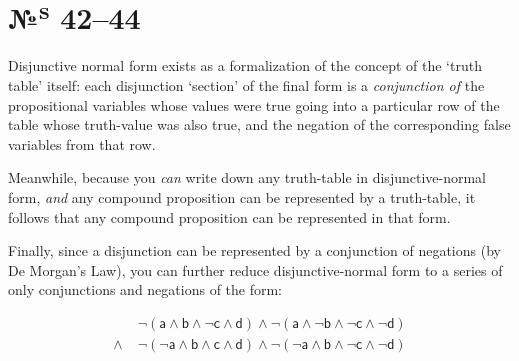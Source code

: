 \documentclass[
   paper=a4,
   fontsize=11pt,
   parskip=no,       %
   fleqn             %
]{scrartcl}
\begin{document}
\pagebreak[2]
\section*{№\kern-0.5bp\textsuperscript{s} 42–44}      %

Disjunctive normal form exists as a formalization of the concept of the ‘truth table’ itself: each
disjunction ‘section’ of the final form is a \textit{conjunction of} the propositional variables
whose values were \textsf{true} going into a particular row of the table whose truth-value was also
\textsf{true}, and the negation of the corresponding \textsf{false} variables from that row.

Meanwhile, because you \textit{can} write down any truth-table in disjunctive-normal form,
\textit{and} any compound proposition can be represented by a truth-table, it follows that any
compound proposition can be represented in that form.

Finally, since a disjunction can be represented by a conjunction of negations (by De Morgan's Law),
you can further reduce disjunctive-normal form to a series of only conjunctions and negations of the
form:

\begin{align*}
            & \mathsf{¬(a \wedge b \wedge ¬c \wedge d) \wedge ¬(a \wedge ¬b \wedge ¬c \wedge ¬d)} \\
   \wedge\; & \mathsf{¬(¬a \wedge b \wedge c \wedge d) \wedge ¬(¬a \wedge b \wedge ¬c \wedge ¬d)} \\
\end{align*}
\end{document}

